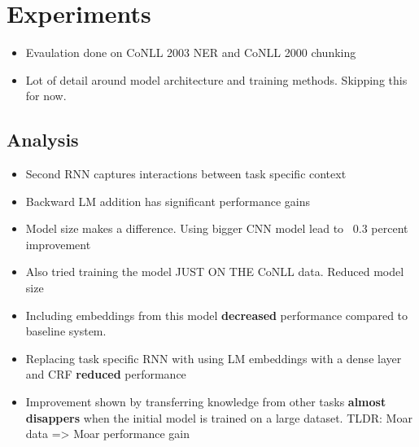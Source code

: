 \documentclass[a4paper]{article}
\begin{document}
\section{Experiments}
\begin{itemize}
    \item Evaulation done on CoNLL 2003 NER and CoNLL 2000 chunking
    \item Lot of detail around model architecture and training methods. Skipping this for now.
\end{itemize}
\subsection{Analysis}
\begin{itemize}
    \item Second RNN captures interactions between task specific context
    \item Backward LM addition has significant performance gains
    \item Model size makes a difference. Using bigger CNN model lead to ~0.3 percent improvement
    \item Also tried training the model JUST ON THE CoNLL data. Reduced model size
    \item Including embeddings from this model \textbf{decreased} performance compared to baseline system.  
    \item Replacing task specific RNN with using LM embeddings with a dense layer and CRF \textbf{reduced} performance 
    \item Improvement shown by transferring knowledge from other tasks \textbf{almost disappers} when the initial model is trained on a large dataset. TLDR: Moar data => Moar performance gain 
\end{itemize}
\end{document}
